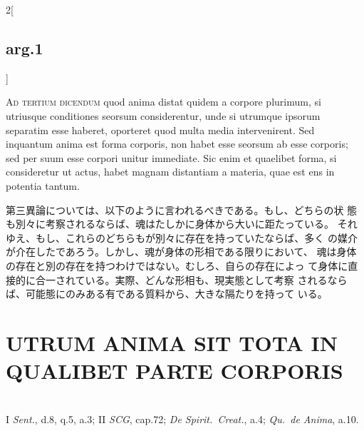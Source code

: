 \documentclass[paper=a4paper,fontsize=10pt,jafontsize=9pt,titlepage]{jlreq}
\begin{document}
\begin{paracol}{2}[\subsection{arg.1}]
\switchcolumn*[\subsection{ad 3}]

{\scshape Ad tertium dicendum} quod anima distat quidem a corpore
plurimum, si utriusque conditiones seorsum considerentur, unde si
utrumque ipsorum separatim esse haberet, oporteret quod multa media
intervenirent. Sed inquantum anima est forma corporis, non habet esse
seorsum ab esse corporis; sed per suum esse corpori unitur
immediate. Sic enim et quaelibet forma, si consideretur ut actus,
habet magnam distantiam a materia, quae est ens in potentia tantum.

\switchcolumn

 第三異論については、以下のように言われるべきである。もし、どちらの状
 態も別々に考察されるならば、魂はたしかに身体から大いに距たっている。
 それゆえ、もし、これらのどちらもが別々に存在を持っていたならば、多く
 の媒介が介在したであろう。しかし、魂が身体の形相である限りにおいて、
 魂は身体の存在と別の存在を持つわけではない。むしろ、自らの存在によっ
 て身体に直接的に合一されている。実際、どんな形相も、現実態として考察
 されるならば、可能態にのみある有である質料から、大きな隔たりを持って
 いる。
\end{paracol}
\newpage
 
\section{UTRUM ANIMA SIT TOTA IN QUALIBET PARTE CORPORIS}
\vspace{1em}
\\
\vspace{1em}
{\footnotesize I {\itshape Sent.}, d.8, q.5, a.3; II {\itshape SCG}, cap.72; {\itshape De Spirit.~Creat.}, a.4; {\itshape Qu.~de Anima}, a.10.}\\
\end{document}
